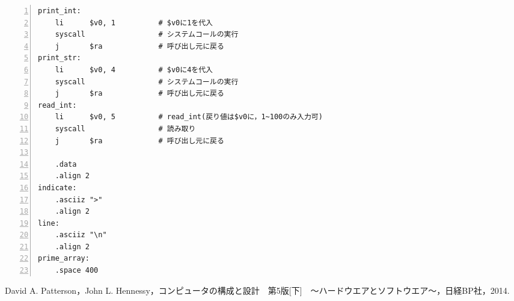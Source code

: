 \begin{Verbatim}[numbers=left, xleftmargin=10mm, numbersep=6pt,
                    fontsize=\small, baselinestretch=0.8]
print_int:
    li      $v0, 1          # $v0に1を代入
    syscall                 # システムコールの実行
    j       $ra             # 呼び出し元に戻る
print_str:
    li      $v0, 4          # $v0に4を代入
    syscall                 # システムコールの実行
    j       $ra             # 呼び出し元に戻る
read_int:
    li      $v0, 5          # read_int(戻り値は$v0に，1~100のみ入力可)
    syscall                 # 読み取り
    j       $ra             # 呼び出し元に戻る

    .data
    .align 2
indicate:
    .asciiz ">"
    .align 2
line:
    .asciiz "\n"
    .align 2
prime_array:
    .space 400
\end{Verbatim}

\begin{thebibliography}{99}
   David A. Patterson，John L. Hennessy，コンピュータの構成と設計　第5版[下]　～ハードウエアとソフトウエア～，日経BP社，2014.
\end{thebibliography}


